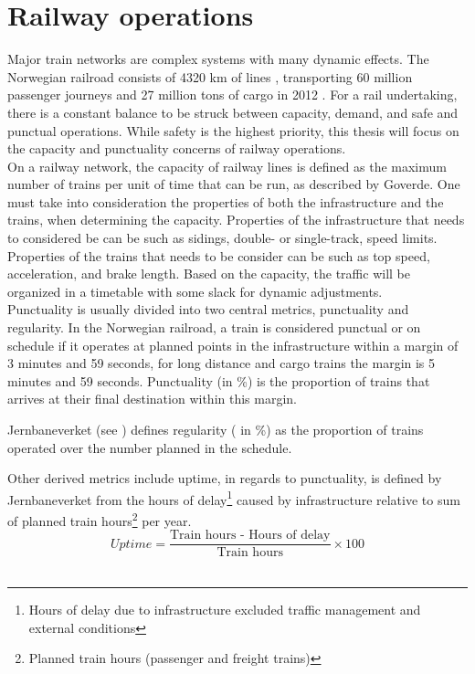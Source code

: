 
\section{Railway operations} %
\label{sec:railway_operations}
Major train networks are complex systems with many dynamic effects. The 
Norwegian railroad consists of 4320 km of lines 
\cite[p. 4]{jernbaneverketStatistikk}, transporting 60 million passenger 
journeys and 27 million tons of cargo in 2012
\cite[p. 9]{jernbaneverketStatistikk}. For a rail undertaking, there is a 
constant balance to be struck between capacity, demand, and safe and punctual 
operations. While safety is the highest priority, this thesis will focus on the
capacity and punctuality concerns of railway operations.\\

On a railway network, the capacity of railway lines is defined as the maximum
number of trains per unit of time that can be run, as described by
Goverde\cite{goverde2005punctuality}. One must take into consideration the 
properties of both the infrastructure and the trains, when determining the 
capacity. Properties of the infrastructure that needs to considered be can be 
such as sidings, double- or single-track, speed limits. Properties of the 
trains that needs to be consider can be such as top speed, acceleration, and
brake length. Based on the capacity, the traffic will be organized in a
timetable with some slack for dynamic adjustments. \\


Punctuality is usually divided into two central metrics, punctuality and 
regularity. In the Norwegian railroad, a train is considered punctual or on 
schedule if it operates at planned points in the infrastructure within a 
margin of 3 minutes and 59 seconds, for long distance and cargo trains the 
margin is 5 minutes and 59 seconds. Punctuality (in \%) is the proportion of 
trains that arrives at their final destination within this margin.

Jernbaneverket (see ) defines regularity (
in \%) as the proportion of trains operated over the number planned in the 
schedule. 

Other derived metrics include uptime, in regards to punctuality, is defined by 
Jernbaneverket from 
the hours of delay\footnote{Hours of delay due to infrastructure excluded 
traffic	management and external conditions} caused by infrastructure relative 
to sum of planned train hours\footnote{Planned train hours (passenger and 
freight trains)} per year.\cite{jernbaneverketPunklighetsTall}
\begin{equation} \label{eq:uptime}
		Uptime =
		\frac
				{
					\text{Train hours - Hours of delay}
				}
				{
					\text{Train hours}
				}\times 100 
\end{equation}\\

